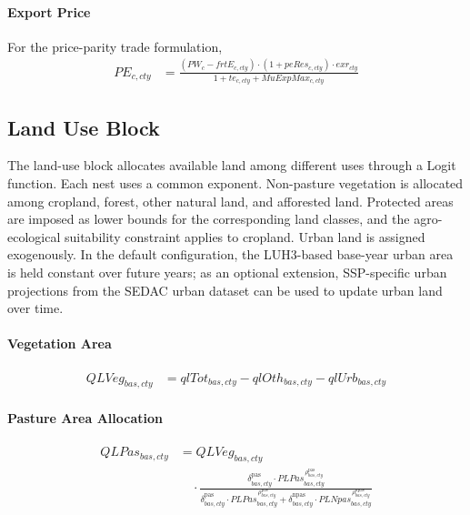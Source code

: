 \paragraph{Export Price}
For the price-parity trade formulation,
\begin{align}
  PE_{c,cty}
  &= \frac{(PW_c-frtE_{c,cty})\cdot
       (1+peRes_{c,cty})\cdot exr_{cty}}
       {1+te_{c,cty}+MuExpMax_{c,cty}}
  \tag{PEEq}\label{eq:PEEq}
\end{align}

\subsection{Land Use Block}

The land-use block allocates available land among different uses through a Logit function. Each nest uses a common exponent.
Non-pasture vegetation is allocated among cropland, forest, other natural land, and afforested land. Protected areas are imposed as lower bounds for the corresponding land classes, and the agro-ecological suitability constraint applies to cropland.  
Urban land is assigned exogenously. In the default configuration, the LUH3-based base-year urban area is held constant over future years; as an optional extension, SSP-specific urban projections from the SEDAC urban dataset can be used to update urban land over time.

\paragraph{Vegetation Area}
\begin{align}
  QLVeg_{bas,cty}
  &= 
     qlTot_{bas,cty}
     - qlOth_{bas,cty}
     - qlUrb_{bas,cty}
  \tag{QLVegBalEq}\label{eq:QLVegBalEq}
\end{align}

\paragraph{Pasture Area Allocation}
\begin{align}
  QLPas_{bas,cty}
  &=
    QLVeg_{bas,cty}
    \nonumber\\[-0.3em]
  &\quad\cdot
    \frac{
      \delta^{\text{pas}}_{bas,cty}
      \cdot
      PLPas_{bas,cty}^{\,\rho^{\text{pas}}_{bas,cty}}
    }{
      \delta^{\text{pas}}_{bas,cty}
      \cdot
      PLPas_{bas,cty}^{\,\rho^{\text{pas}}_{bas,cty}}
      +
      \delta^{\text{npas}}_{bas,cty}
      \cdot
      PLNpas_{bas,cty}^{\,\rho^{\text{npas}}_{bas,cty}}
    }
  \tag{PasLogitEq}\label{eq:PasLogitEq}
\end{align}

